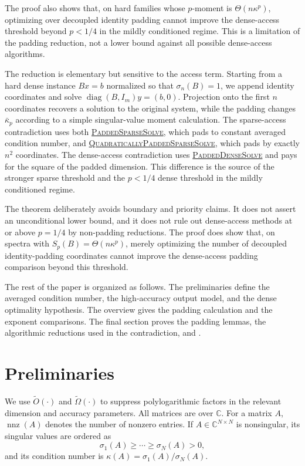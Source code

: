 \documentclass[11pt]{article}
\begin{document}
The proof also shows that, on hard families whose $p$-moment is
$\Theta(n\kappa^p)$, optimizing over decoupled identity padding cannot improve
the dense-access threshold beyond $p<1/4$ in the mildly conditioned regime.
This is a limitation of the padding reduction, not a lower bound against all
possible dense-access algorithms.

The reduction is elementary but sensitive to the access term.  Starting from a
hard dense instance $Bx=b$ normalized so that $\sigma_n(B)=1$, we append
identity coordinates and solve
$\operatorname{diag}(B,I_m)y=(b,0)$.  Projection onto the first $n$ coordinates
recovers a solution to the original system, while the padding changes
$\bar{\kappa}_p$ according to a simple singular-value moment calculation.  The
sparse-access contradiction uses both
\hyperref[alg:padded-sparse-solve]{\textsc{PaddedSparseSolve}}, which pads to
constant averaged condition number, and
\hyperref[alg:quadratically-padded-sparse-solve]{\textsc{QuadraticallyPaddedSparseSolve}},
which pads by exactly $n^2$ coordinates.  The dense-access contradiction uses
\hyperref[alg:padded-dense-solve]{\textsc{PaddedDenseSolve}} and pays for the
square of the padded dimension.  This difference is the source of the stronger
sparse threshold and the $p<1/4$ dense threshold in the mildly conditioned
regime.

The theorem deliberately avoids boundary and priority claims.  It does not
assert an unconditional lower bound, and it does not rule out dense-access
methods at or above $p=1/4$ by non-padding reductions.  The proof does show
that, on spectra with $S_p(B)=\Theta(n\kappa^p)$, merely optimizing the number
of decoupled identity-padding coordinates cannot improve the dense-access
padding comparison beyond this threshold.

The rest of the paper is organized as follows.  The preliminaries define the
averaged condition number, the high-accuracy output model, and the dense
optimality hypothesis.  The overview gives the padding calculation and the
exponent comparisons.  The final section proves the padding lemmas, the
algorithmic reductions used in the contradiction, and .

\section{Preliminaries}

We use $\widetilde{O}(\cdot)$ and $\widetilde{\Omega}(\cdot)$ to suppress
polylogarithmic factors in the relevant dimension and accuracy parameters.
All matrices are over $\mathbb{C}$.  For a matrix $A$,
$\operatorname{nnz}(A)$ denotes the number of nonzero entries.  If
$A\in\mathbb{C}^{N\times N}$ is nonsingular, its singular values are ordered
as
\[
  \sigma_1(A)\geq \cdots\geq\sigma_N(A)>0,
\]
and its condition number is $\kappa(A)=\sigma_1(A)/\sigma_N(A)$.
\end{document}

